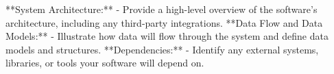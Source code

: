 **System Architecture:**
   - Provide a high-level overview of the software's architecture, including any third-party integrations.
**Data Flow and Data Models:**
   - Illustrate how data will flow through the system and define data models and structures.
**Dependencies:**
    - Identify any external systems, libraries, or tools your software will depend on.